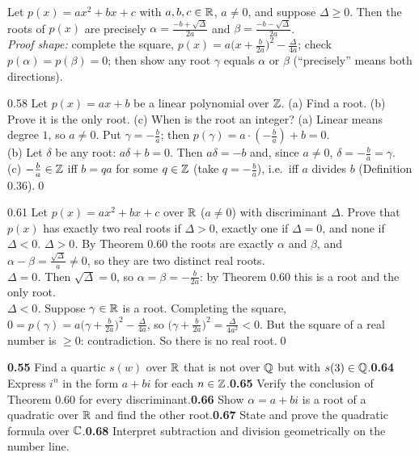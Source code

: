 \begin{result}
Let $p(x)=ax^2+bx+c$ with $a,b,c\in\mathbb{R}$, $a\ne0$, and suppose $\Delta\ge0$. Then the roots of $p(x)$ are precisely $\alpha=\frac{-b+\sqrt\Delta}{2a}$ and $\beta=\frac{-b-\sqrt\Delta}{2a}$.\\
\emph{Proof shape:} complete the square, $p(x)=a\big(x+\frac b{2a}\big)^2-\frac\Delta{4a}$; check $p(\alpha)=p(\beta)=0$; then show any root $\gamma$ equals $\alpha$ or $\beta$ (``precisely'' means both directions).
\end{result}

\begin{bookex}{0.58}
Let $p(x)=ax+b$ be a linear polynomial over $\mathbb{Z}$. (a) Find a root. (b) Prove it is the only root. (c) When is the root an integer?
\solution
(a) Linear means degree $1$, so $a\ne0$. Put $\gamma=-\frac ba$; then $p(\gamma)=a\cdot(-\frac ba)+b=0$.\\
(b) Let $\delta$ be any root: $a\delta+b=0$. Then $a\delta=-b$ and, since $a\ne0$, $\delta=-\frac ba=\gamma$.\\
(c) $-\frac ba\in\mathbb{Z}$ iff $b=qa$ for some $q\in\mathbb{Z}$ (take $q=-\frac ba$), i.e.\ iff $a$ divides $b$ (Definition 0.36).\qed
\end{bookex}

\begin{bookex}{0.61}
Let $p(x)=ax^2+bx+c$ over $\mathbb{R}$ ($a\ne0$) with discriminant $\Delta$. Prove that $p(x)$ has exactly two real roots if $\Delta>0$, exactly one if $\Delta=0$, and none if $\Delta<0$.
\solution
\emph{$\Delta>0$.} By Theorem 0.60 the roots are exactly $\alpha$ and $\beta$, and $\alpha-\beta=\frac{\sqrt\Delta}{a}\ne0$, so they are two distinct real roots.\\
\emph{$\Delta=0$.} Then $\sqrt\Delta=0$, so $\alpha=\beta=-\frac b{2a}$: by Theorem 0.60 this is a root and the only root.\\
\emph{$\Delta<0$.} Suppose $\gamma\in\mathbb{R}$ is a root. Completing the square, $0=p(\gamma)=a\big(\gamma+\frac b{2a}\big)^2-\frac\Delta{4a}$, so $\big(\gamma+\frac b{2a}\big)^2=\frac{\Delta}{4a^2}<0$. But the square of a real number is $\ge0$: contradiction. So there is no real root.\qed
\end{bookex}

\begin{trybox}[{0.55, 0.64--0.68 \fO}]
\textbf{0.55} Find a quartic $s(w)$ over $\mathbb{R}$ that is not over $\mathbb{Q}$ but with $s(3)\in\mathbb{Q}$.\quad \textbf{0.64} Express $i^n$ in the form $a+bi$ for each $n\in\mathbb{Z}$.\quad \textbf{0.65} Verify the conclusion of Theorem 0.60 for every discriminant.\quad \textbf{0.66} Show $\alpha=a+bi$ is a root of a quadratic over $\mathbb{R}$ and find the other root.\quad \textbf{0.67} State and prove the quadratic formula over $\mathbb{C}$.\quad \textbf{0.68} Interpret subtraction and division geometrically on the number line.
\end{trybox}

